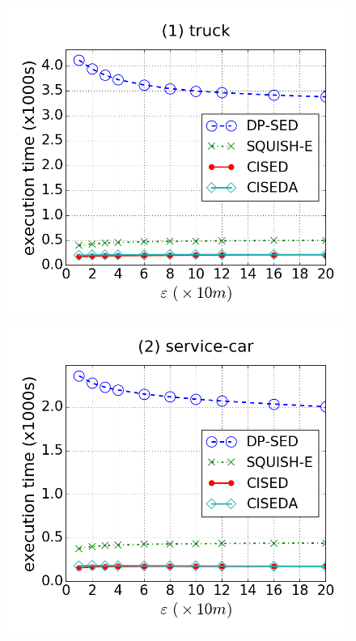 \begin{figure}[tb!]
\centering
\includegraphics[scale = 0.245]{figures/Exp-time-epsilon-truck.png}
\includegraphics[scale = 0.245]{figures/Exp-time-epsilon-service.png}

\end{figure}
